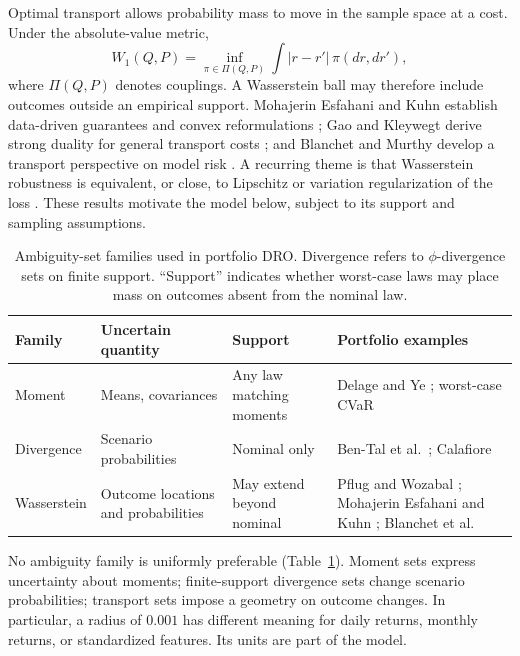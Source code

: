 Optimal transport allows probability mass to move in the sample space at a cost. Under the absolute-value metric,
\begin{equation}
W_1(Q,P)=\inf_{\pi\in\Pi(Q,P)}\int |r-r'|\,\pi(dr,dr'),
\end{equation}
where $\Pi(Q,P)$ denotes couplings. A Wasserstein ball may therefore include outcomes outside an empirical support. Mohajerin Esfahani and Kuhn establish data-driven guarantees and convex reformulations \cite{esfahani}; Gao and Kleywegt derive strong duality for general transport costs \cite{gaokleywegt}; and Blanchet and Murthy develop a transport perspective on model risk \cite{blanchet}. A recurring theme is that Wasserstein robustness is equivalent, or close, to Lipschitz or variation regularization of the loss \cite{shafieezadeh,gaochen}. These results motivate the model below, subject to its support and sampling assumptions.

\begin{table}[t]
\centering\footnotesize\setlength{\tabcolsep}{3pt}
\caption{Ambiguity-set families used in portfolio DRO. Divergence refers to $\phi$-divergence sets on finite support. ``Support'' indicates whether worst-case laws may place mass on outcomes absent from the nominal law.}
\label{tab:families}
\begin{tabular}{@{}>{\raggedright}p{1.35cm}>{\raggedright}p{1.8cm}>{\raggedright}p{1.35cm}>{\raggedright\arraybackslash}p{2.50cm}@{}}\toprule
Family&Uncertain quantity&Support&Portfolio examples\\\midrule
Moment&Means, covariances&Any law matching moments&Delage and Ye \cite{delage}; worst-case CVaR \cite{zhu}\\
Divergence&Scenario probabilities&Nominal only&Ben-Tal et al.\ \cite{bental}; Calafiore \cite{calafiore}\\
Wasserstein&Outcome locations and probabilities&May extend beyond nominal&Pflug and Wozabal \cite{pflug}; Mohajerin Esfahani and Kuhn \cite{esfahani}; Blanchet et al.\ \cite{bcz}\\\bottomrule
\end{tabular}
\end{table}

No ambiguity family is uniformly preferable (Table~\ref{tab:families}). Moment sets express uncertainty about moments; finite-support divergence sets change scenario probabilities; transport sets impose a geometry on outcome changes. In particular, a radius of $0.001$ has different meaning for daily returns, monthly returns, or standardized features. Its units are part of the model.

